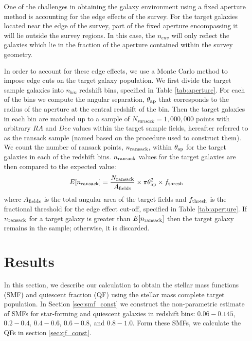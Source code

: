 \documentclass{emulateapj}
\begin{document}
One of the challenges in obtaining the galaxy environment using a fixed aperture method is accounting for the edge effects of the survey.
For the target galaxies located near the edge of the survey, part of the fixed aperture encompassing it will lie outside the survey regions. 
In this case, the $n_{env}$ will only reflect the galaxies which lie in the fraction of the aperture contained within the survey geometry.

In order to account for these edge effects, we use a Monte Carlo method to impose edge cuts on the target galaxy population. 
We first divide the target sample galaxies into $n_{bin}$ redshift bins, specified in Table \ref{tab:aperture}. 
For each of the bins we compute the angular separation, $\theta_{\rm{ap}}$ that corresponds to the radius of the aperture at the central redshift of the bin.
Then the target galaxies in each bin are matched up to a sample of $N_{ransack}=1,000,000$ points with arbitrary $RA$ and $Dec$ values within the target sample fields, 
hereafter referred to as the ransack sample (named based on the procedure used to construct them). 
We count the number of ransack points, $n_{\rm{ransack}}$, within $\theta_{\rm{ap}}$ for the target galaxies in each of the redshift bins.
$n_{\rm{ransack}}$ values for the target galaxies are then compared to the expected value:
\begin{equation} \label{eq:ransack}
E[n_{\rm{ransack}}] = \frac{N_{\rm{ransack}}}{A_{\rm{fields}}}\times {\pi \theta_{\rm{ap}}^2} \times f_{\rm{thresh}} 
\end{equation} 
where $A_{\rm{fields}}$ is the total angular area of the target fields and $f_{\rm{thresh}}$ is the fractional threshold for the edge effect cut-off, specified in Table 
\ref{tab:aperture}.
If $n_{\rm{ransack}}$ for a target galaxy is greater than $E[n_{\rm{ransack}}]$ then the target galaxy remains in the sample; otherwise, it is discarded. 

\section{Results}
In this section, we describe our calculation to obtain the stellar mass functions (SMF) and quiescent fraction (QF) using the stellar mass complete target population.
In Section \ref{sec:smf_const} we construct the non-parametric estimate of SMFs for star-forming and quiescent galaxies in redshift bins: $0.06-0.145$, $0.2-0.4$, 
$0.4-0.6$, $0.6-0.8$, and $0.8-1.0$.
Form these SMFs, we calculate the QFs in section \ref{sec:qf_const}.
\end{document}
